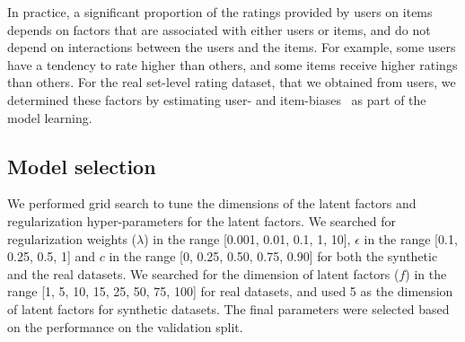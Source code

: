 In practice, 
a significant proportion of the ratings provided by users on items
depends on factors that are associated with either users or items, and do not
depend on interactions between the users and the items. For example, some users
have a tendency to rate higher than others, and some items receive higher
ratings than others. For the real set-level rating dataset, that we obtained from
\ML users, we determined these factors by estimating user- and
item-biases~\cite{koren2009matrix} as part of the model learning.




\iffalse
We followed the above procedure on all the splits of synthetic datasets
generated using the approaches described in Section~\ref{EVALDATA} and report average value
of the performance assessment metrics for each of the approaches. 
Similarly we repeated the above process five times for \MLREALSETS  and report
the average value of metrics across the runs.  
\fi



\subsection{Model selection}
We performed grid search to tune the dimensions of the latent factors and
regularization hyper-parameters for the latent factors. 
We searched
for regularization weights ($\lambda$) in the range [0.001, 0.01, 0.1, 1, 10],
$\epsilon$ in the range [0.1, 0.25, 0.5, 1] and $c$ in the range [0, 0.25, 0.50,
0.75, 0.90] for both the synthetic and the real
datasets.
We searched for the dimension of latent factors ($f$) in the range [1, 5, 10,
15, 25, 50, 75, 100] for real datasets, and used 5 as the dimension
of latent factors for synthetic datasets.
The final
parameters were selected based on the performance on the validation split. 

